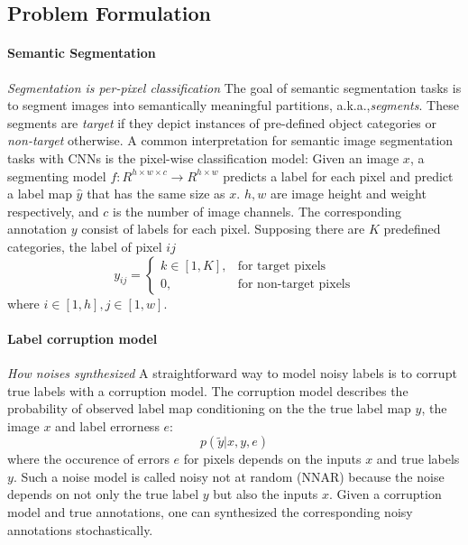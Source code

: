 \subsection{Problem Formulation}
\label{subsec:formulation}

\paragraph{Semantic Segmentation}
\noindent \textit{Segmentation is per-pixel classification}
\noindent
The goal of semantic segmentation tasks is to segment images into semantically meaningful partitions, a.k.a.,\textit{segments}.
These segments are \textit{target} if they depict instances of pre-defined object categories or \textit{non-target} otherwise.
A common interpretation for semantic image segmentation tasks with CNNs is the pixel-wise classification model:
Given an image $x$, a segmenting model $f: R^{h \times w \times c} \rightarrow R^{h \times w}$ predicts a label for each pixel and predict a label map $\hat{y}$ that has the same size as $x$.
$h, w$ are image height and weight respectively, and $c$ is the number of image channels.
The corresponding annotation $y$ consist of labels for each pixel.
Supposing there are $K$ predefined categories, the label of pixel ${ij}$
\[
  y_{ij} =
    \begin{cases}
      k \in [1,K], & \text{for target pixels} \\
      0, & \text{for non-target pixels}
    \end{cases}
\]
where $i \in [1,h], j \in [1,w]$.

\paragraph{Label corruption model}
\noindent \textit{How noises synthesized}
\noindent
A straightforward way to model noisy labels is to corrupt true labels with a corruption model.
The corruption model describes the probability of observed label map conditioning on the the true label map $y$, the image $x$ and label errorness $e$:
$$p(\tilde{y} \vert x, y, e)$$
where the occurence of errors $e$ for pixels depends on the inputs $x$ and true labels $y$.
Such a noise model is called noisy not at random (NNAR) \cite{frenay2014classification} because the noise depends on not only the true label $y$ but also the inputs $x$.
Given a corruption model and true annotations, one can synthesized the corresponding noisy annotations stochastically.


